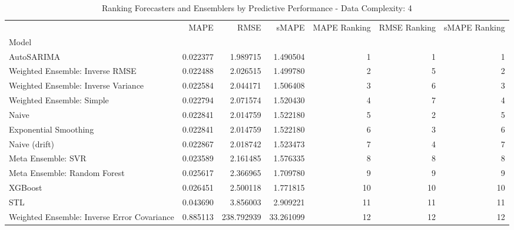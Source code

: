 \begin{table}
\caption{Ranking Forecasters and Ensemblers by Predictive Performance - Data Complexity: 4}
\begin{tabular}{lrrrrrr}
\toprule
 & MAPE & RMSE & sMAPE & MAPE Ranking & RMSE Ranking & sMAPE Ranking \\
Model &  &  &  &  &  &  \\
\midrule
AutoSARIMA & 0.022377 & 1.989715 & 1.490504 & 1 & 1 & 1 \\
Weighted Ensemble: Inverse RMSE & 0.022488 & 2.026515 & 1.499780 & 2 & 5 & 2 \\
Weighted Ensemble: Inverse Variance & 0.022584 & 2.044171 & 1.506408 & 3 & 6 & 3 \\
Weighted Ensemble: Simple & 0.022794 & 2.071574 & 1.520430 & 4 & 7 & 4 \\
Naive & 0.022841 & 2.014759 & 1.522180 & 5 & 2 & 5 \\
Exponential Smoothing & 0.022841 & 2.014759 & 1.522180 & 6 & 3 & 6 \\
Naive (drift) & 0.022867 & 2.018742 & 1.523473 & 7 & 4 & 7 \\
Meta Ensemble: SVR & 0.023589 & 2.161485 & 1.576335 & 8 & 8 & 8 \\
Meta Ensemble: Random Forest & 0.025617 & 2.366965 & 1.709780 & 9 & 9 & 9 \\
XGBoost & 0.026451 & 2.500118 & 1.771815 & 10 & 10 & 10 \\
STL & 0.043690 & 3.856003 & 2.909221 & 11 & 11 & 11 \\
Weighted Ensemble: Inverse Error Covariance & 0.885113 & 238.792939 & 33.261099 & 12 & 12 & 12 \\
\bottomrule
\end{tabular}
\end{table}
